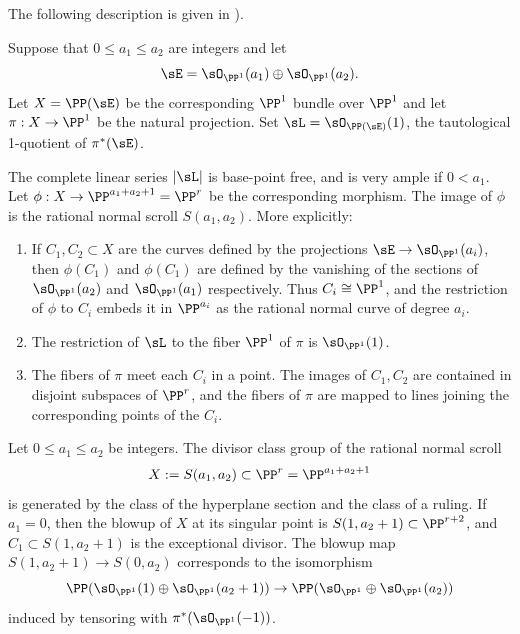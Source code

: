 The following description is  given in  \cite[Proposition V.2.2 and V.2.3]{Hartshorne1977}).

\begin{theorem} 
Suppose that $0\leq a_1\leq a_2$ are integers and let 
$$
\sE = \sO_{\PP^1}(a_1) \oplus \sO_{\PP^1}(a_2).
$$
 Let $X = \PP(\sE)$  be the corresponding $\PP^1$ bundle over $\PP^1$
and let $\pi: X \to \PP^1$ be the natural projection. Set $\sL =   \sO_{\PP(\sE)}(1)$, the tautological 1-quotient of $\pi^*(\sE)$.

The complete linear series $|\sL|$ is base-point free, and is very ample if $0<a_1$. 
Let $\phi:X\to \PP^{a_1+a_2+1} = \PP^r$ be the corresponding morphism. The image of $\phi$ is the rational normal scroll $S(a_1,a_2).$
More explicitly:
\begin{enumerate}
 \item If $C_1, C_2\subset X$ are the curves defined by the projections $\sE \to \sO_{\PP^1}(a_i)$, then $\phi(C_1)$ and $\phi(C_1)$
 are defined by the vanishing
of the sections of $\sO_{\PP^1}(a_2)$ and  $\sO_{\PP^1}(a_1)$ respectively. Thus $C_i \cong \PP^1$,
and  the restriction of $\phi$ to $C_i$ embeds it in $\PP^{a_i}$ as the rational normal curve of degree $a_i$.

\item The restriction of $\sL$ to the fiber $\PP^1$ of $\pi$ is $\sO_{\PP^1}(1)$.

\item The fibers of $\pi$ meet each $C_i$ in a point. The images of $C_1, C_2$ are contained in disjoint subspaces of $\PP^r$, and the fibers of $\pi$ are mapped 
to lines joining the corresponding points of the $C_i$.
\end{enumerate}
\end{theorem}


\begin{corollary}\cite[Section V.2]{Hartshorne1977}
Let $0\leq a_1\leq a_2$ be integers. The divisor class group of the 
rational normal scroll 
$$
X:=S(a_1,a_2) \subset \PP^r = \PP^{a_1+a_2+1}
$$
is generated by the class of the hyperplane section and the class
of a ruling. If $a_1 = 0$, then the blowup of $X$ at its singular point is $S(1, a_2+1)\subset \PP^{r+2}$,
and $C_1\subset S(1, a_2+1)$ is the exceptional divisor. The blowup map $S(1, a_2+1) \to S(0,a_2)$
corresponds to the isomorphism 
$$
\PP(\sO_{\PP^1}(1) \oplus \sO_{\PP^1}(a_2+1)) \to \PP(\sO_{\PP^1} \oplus \sO_{\PP^1}(a_2))
$$
induced by tensoring with $\pi^*(\sO_{\PP^1}(-1))$.
\end{corollary}

